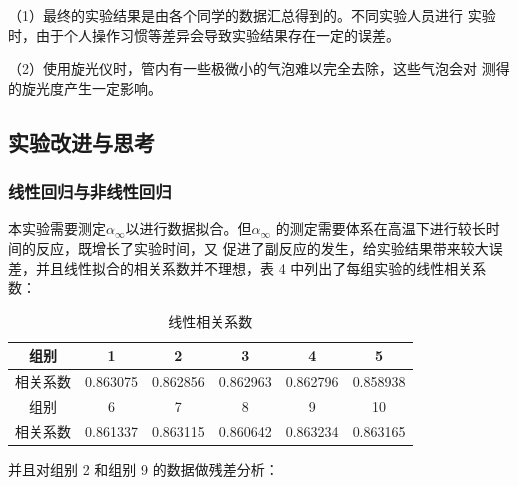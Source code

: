 \documentclass[12pt]{ctexart}
\numberwithin{equation}{section}
\begin{document}
（1）最终的实验结果是由各个同学的数据汇总得到的。不同实验人员进行
实验时，由于个人操作习惯等差异会导致实验结果存在一定的误差。

（2）使用旋光仪时，管内有一些极微小的气泡难以完全去除，这些气泡会对
测得的旋光度产生一定影响。

\subsection{实验改进与思考}

\subsubsection{线性回归与非线性回归}

本实验需要测定$\alpha_\infty$以进行数据拟合。但$\alpha_\infty$
的测定需要体系在高温下进行较长时间的反应，既增长了实验时间，又
促进了副反应的发生，给实验结果带来较大误差，并且线性拟合的相关系数并不理想，表 4 中列出了每组实验的线性相关系数：

\begin{longtable}{|c|c|c|c|c|c|}
    \caption{线性相关系数} \\
    \hline
    组别 & 1 & 2 & 3 & 4 & 5\\
    \hline
    相关系数 & 0.863075 & 0.862856 & 0.862963 & 0.862796 & 0.858938 \\
    \hline
    组别 & 6 & 7 & 8 & 9 & 10\\
    \hline
    相关系数 & 0.861337 & 0.863115 & 0.860642 & 0.863234 & 0.863165 \\
    \hline
\end{longtable}

并且对组别 2 和组别 9 的数据做残差分析：
\end{document}
